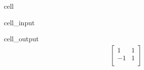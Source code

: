 \documentclass[letterpaper,10pt,english]{jupyterBook}
\begin{document}
\begin{sphinxuseclass}{cell}\begin{sphinxVerbatimInput}

\begin{sphinxuseclass}{cell_input}
\begin{sphinxVerbatim}[commandchars=\\\{\}]
  \PYG{p}{[}\PYG{p}{[} \PYG{p}{]} \PYG{p}{[} \PYG{p}{]}\PYG{p}{]}
\end{sphinxVerbatim}

\end{sphinxuseclass}\end{sphinxVerbatimInput}
\begin{sphinxVerbatimOutput}

\begin{sphinxuseclass}{cell_output}\begin{equation*}
\begin{split}\begin{bmatrix}
1 & 1  \\
 -1 & 1  \\
 \end{bmatrix}
\end{split}
\end{equation*}
\end{sphinxuseclass}\end{sphinxVerbatimOutput}

\end{sphinxuseclass}
\end{document}
